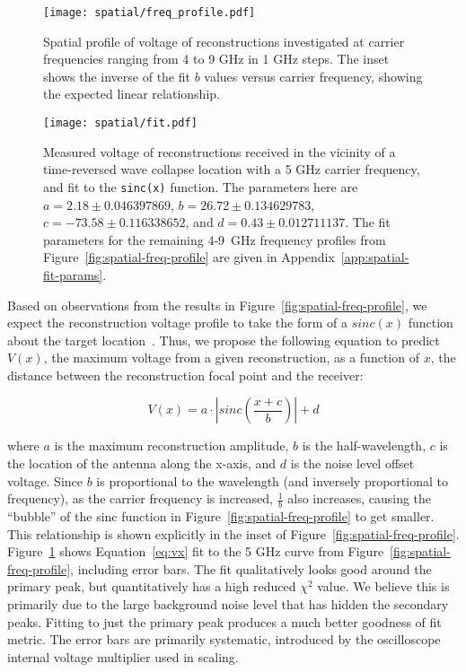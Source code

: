 \begin{figure}
\texttt{[image: spatial/freq\_profile.pdf]}
\caption[Spatial profile of reconstruction at various frequencies]{Spatial profile of \ptp{} voltage of reconstructions investigated at carrier frequencies ranging from 4 to 9 GHz in 1 GHz
steps.  The inset shows the inverse of the fit $b$ values versus carrier frequency, showing the expected linear relationship.}
\label{fig:spatial-freq-profile}

\vspace*{\floatsep}%

\texttt{[image: spatial/fit.pdf]}
\caption[Fit of spatial profile]{Measured \ptp{} voltage of reconstructions received in the
vicinity of a time-reversed wave collapse location with a 5 GHz carrier
frequency, and fit to the \texttt{sinc(x)} function. The parameters here are $a = 2.18 \pm 0.046397869$, $b = 26.72 \pm 0.134629783$, $c = -73.58 \pm 0.116338652$, and $d = 0.43 \pm 0.012711137$. The fit parameters for the remaining 4-9~GHz frequency profiles from Figure~\ref{fig:spatial-freq-profile} are given in Appendix~\ref{app:spatial-fit-params}.}
\label{fig:spatial-error-fit}
\end{figure}

Based on observations from the results in Figure~\ref{fig:spatial-freq-profile}, we expect the reconstruction \ptp{} voltage profile to take the form of a $sinc(x)$ function about the target location~\cite{lerosey-focusing}. Thus, we propose the following equation to predict $V(x)$, the maximum \ptp{} voltage from a given reconstruction, as a function of $x$, the distance between the reconstruction focal point and the receiver:

\begin{equation}
\label{eq:vx}
V(x) = a\cdot |sinc\left(\frac{x+c}{b}\right)| + d
\end{equation}

where $a$ is the maximum \ptp{} reconstruction amplitude, $b$ is the half-wavelength, $c$ is the location of the antenna along the x-axis, and $d$ is the noise level offset voltage. Since $b$ is proportional to the wavelength (and inversely proportional to frequency), as the carrier frequency is increased,  $\frac{1}{b}$ also increases, causing the ``bubble'' of the sinc function in Figure~\ref{fig:spatial-freq-profile} to get smaller. This relationship is shown explicitly in the inset of Figure~\ref{fig:spatial-freq-profile}. Figure~\ref{fig:spatial-error-fit} shows Equation~\ref{eq:vx} fit to the 5 GHz curve from Figure~\ref{fig:spatial-freq-profile}, including error bars. The fit qualitatively looks good around the primary peak, but quantitatively has a high reduced $\chi^2$ value. We believe this is primarily due to the large background noise level that has hidden the secondary peaks. Fitting to just the primary peak produces a much better goodness of fit metric. The error bars are primarily systematic, introduced by the oscilloscope internal voltage multiplier used in scaling.

